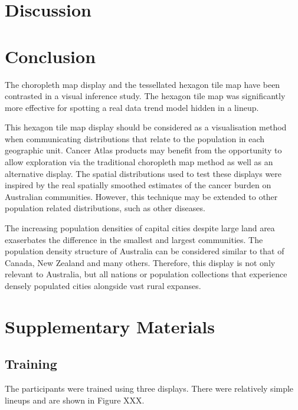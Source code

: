 \documentclass[conference,final,]{IEEEtran}
\begin{document}
\hypertarget{discussion}{%
\section{Discussion}\label{discussion}}

\hypertarget{conclusion}{%
\section{Conclusion}\label{conclusion}}

The choropleth map display and the tessellated hexagon tile map have
been contrasted in a visual inference study. The hexagon tile map was
significantly more effective for spotting a real data trend model hidden
in a lineup.

This hexagon tile map display should be considered as a visualisation
method when communicating distributions that relate to the population in
each geographic unit. Cancer Atlas products may benefit from the
opportunity to allow exploration via the traditional choropleth map
method as well as an alternative display. The spatial distributions used
to test these displays were inspired by the real spatially smoothed
estimates of the cancer burden on Australian communities. However, this
technique may be extended to other population related distributions,
such as other diseases.

The increasing population densities of capital cities despite large land
area exaserbates the difference in the smallest and largest communities.
The population density structure of Australia can be considered similar
to that of Canada, New Zealand and many others. Therefore, this display
is not only relevant to Australia, but all nations or population
collections that experience densely populated cities alongside vast
rural expanses.

\hypertarget{supplementary-materials}{%
\section{Supplementary Materials}\label{supplementary-materials}}

\hypertarget{training}{%
\subsection{Training}\label{training}}

The participants were trained using three displays. There were
relatively simple lineups and are shown in Figure XXX.
\end{document}
